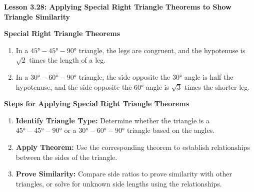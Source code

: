 \begin{center}
\textbf{Lesson 3.28: Applying Special Right Triangle Theorems to Show Triangle Similarity}
\end{center}

\vspace*{-1.5ex}

\noindent\textbf{Special Right Triangle Theorems}
\begin{enumerate}[label=\color{blue}\arabic*.]
    \item In a \(45°-45°-90°\) triangle, the legs are congruent, and the hypotenuse is \(\sqrt{2}\) times the length of a leg.
    \item In a \(30°-60°-90°\) triangle, the side opposite the \(30°\) angle is half the hypotenuse, and the side opposite the \(60°\) angle is \(\sqrt{3}\) times the shorter leg.
\end{enumerate}

\noindent\textbf{Steps for Applying Special Right Triangle Theorems}
\begin{enumerate}
    \item \textbf{Identify Triangle Type:} Determine whether the triangle is a \(45°-45°-90°\) or a \(30°-60°-90°\) triangle based on the angles.
    \item \textbf{Apply Theorem:} Use the corresponding theorem to establish relationships between the sides of the triangle.
    \item \textbf{Prove Similarity:} Compare side ratios to prove similarity with other triangles, or solve for unknown side lengths using the relationships.
\end{enumerate}
